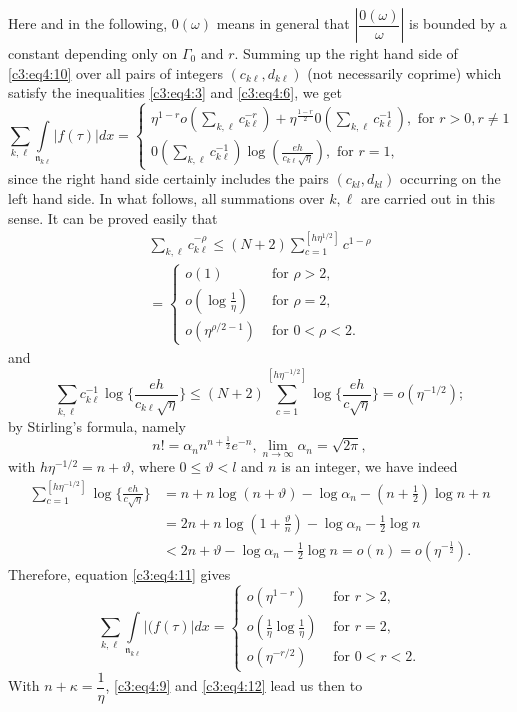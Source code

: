 Here and in the following, $0(\omega)$ means in general that
$|\dfrac{0(\omega)}{\omega}|$  is bounded by a constant depending only
on $\Gamma_0$ and $r$. Summing up the right hand side of \eqref{c3:eq4:10} over all
pairs of integers $(c_{k\ell}, d_{k\ell})$ (not necessarily coprime)
which satisfy the inequalities \eqref{c3:eq4:3} and \eqref{c3:eq4:6}, we get
\begin{equation*}
\sum\limits_{k,\ell}
\int\limits_{\mathfrak{n}_{k\ell}} |f(\tau)|dx = 
\begin{cases}
\eta^{1-r} o(\sum_{k,\ell} c^{-r}_{k\ell}) + \eta^{\frac{1-r}{2}} 0
(\sum_{k,\ell} c^{-1}_{k\ell}), \text{ for } r>0, r\neq 1\\[5pt]
0(\sum_{k,\ell} c^{-1}_{k\ell}) \log (\frac{eh}{c_{k\ell}
  \sqrt{\eta}}), \text{ for } r = 1, 
\end{cases}\tag{11}\label{c3:eq4:11}
\end{equation*}
since the right hand side certainly includes the pairs $(c_{kl},
d_{kl})$ occurring on the left hand side. In what follows, all
summations over $k,\ell$ are carried out in this sense. It can be
proved easily that 
\begin{gather*}
\sum_{k,\ell} c^{-\rho}_{k\ell} \leq (N+2) \sum^{[h\eta^{1/2}]}_{c=1}
c^{1-\rho}\\
= \begin{cases}
o(1) & \text{ for } \rho > 2,\\
o(\log\frac{1}{\eta}) & \text{ for } \rho =2,\\
o (\eta^{\rho/2-1}) & \text{ for } 0< \rho < 2.
\end{cases}
\end{gather*}
and
$$
\sum_{k,\ell} c^{-1}_{k\ell} \log \{\frac{eh}{c_{k\ell}\sqrt{\eta}}\} 
\leq (N+2) \sum^{[h\eta^{-1/2}]}_{c=1} \log
\{\frac{eh}{c\sqrt{\eta}}\} = o (\eta^{-1/2});
$$
by Stirling's \pageoriginale formula, namely
$$
n! = \alpha_n n^{n+\frac{1}{2}} e^{-n}, \lim\limits_{n\to \infty}
\alpha_n = \sqrt{2\pi}, 
$$
with $h\eta^{-1/2}=n+\vartheta$, where $0\leq \vartheta<l$ and $n$ is
an integer, we have indeed 
\begin{align*}
\sum^{[h\eta^{-1/2}]}_{c=1} \log\{\frac{eh}{c\sqrt{\eta}}\} & = n + n
\log (n + \vartheta) - \log \alpha_n - (n+ \frac{1}{2}) \log n + n \\
& = 2n + n \log (1+ \frac{\vartheta}{n}) - \log \alpha_n -\frac{1}{2}
\log n \\
& < 2n + \vartheta  - \log \alpha_n -\frac{1}{2} \log n = o(n) =
o(\eta^{-\frac{1}{2}}). 
\end{align*}
Therefore, equation \eqref{c3:eq4:11} gives 
\begin{equation*}
\sum_{k,\ell} \int\limits_{\mathfrak{n}_{k\ell}} |(f(\tau)| dx = 
\begin{cases}
o(\eta^{1-r}) & \text{ for } r > 2,\\
o(\frac{1}{\eta} \log \frac{1}{\eta}) & \text{ for } r = 2, \\
o(\eta^{-r/2}) & \text{ for } 0 < r < 2.
\end{cases}\tag{12}\label{c3:eq4:12}
\end{equation*}
With $n + \kappa =\dfrac{1}{\eta}$, \eqref{c3:eq4:9} and 
\eqref{c3:eq4:12} lead us then to

